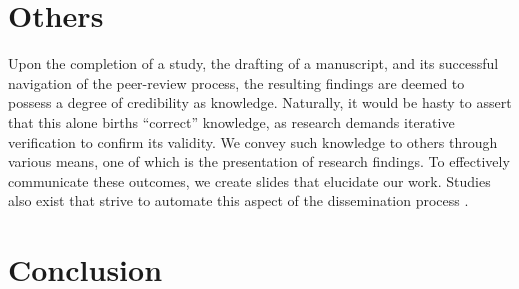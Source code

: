 \section{Others}

Upon the completion of a study, the drafting of a manuscript, and its successful navigation of the peer-review process, the resulting findings are deemed to possess a degree of credibility as knowledge. Naturally, it would be hasty to assert that this alone births ``correct'' knowledge, as research demands iterative verification to confirm its validity. We convey such knowledge to others through various means, one of which is the presentation of research findings. To effectively communicate these outcomes, we create slides that elucidate our work. Studies also exist that strive to automate this aspect of the dissemination process \cite{sefid2019automatic}.

\section{Conclusion}